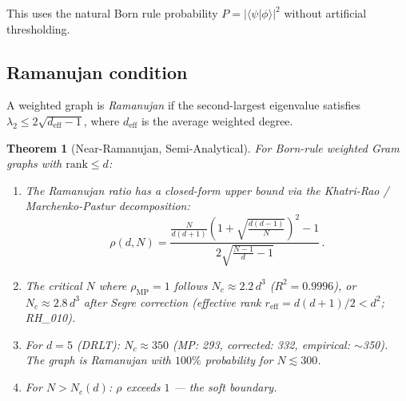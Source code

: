 \documentclass[12pt]{article}
\newtheorem{theorem}{Theorem}[section]
\theoremstyle{definition}
\theoremstyle{remark}
\newcommand{\rank}{\mathrm{rank}}
\begin{document}
This uses the natural Born rule probability
$P = |\langle\psi|\phi\rangle|^2$
without artificial thresholding.

\subsection{Ramanujan condition}

A weighted graph is \emph{Ramanujan} if the second-largest
eigenvalue satisfies
$\lambda_2 \leq 2\sqrt{d_{\mathrm{eff}} - 1}$,
where $d_{\mathrm{eff}}$ is the average weighted degree.

\begin{theorem}[Near-Ramanujan, Semi-Analytical]\label{thm:ram}
For Born-rule weighted Gram graphs with $\rank \leq d$:
\begin{enumerate}[label=(\roman*)]
\item The Ramanujan ratio has a closed-form upper bound via the
  Khatri-Rao / Marchenko-Pastur decomposition:
  \begin{equation}\label{eq:rhoMP}
  \rho(d,N)
    = \frac{\frac{N}{d(d+1)}
      \left(1 + \sqrt{\frac{d(d-1)}{N}}\right)^{\!2} - 1}
      {2\sqrt{\frac{N-1}{d}-1}}\,.
  \end{equation}
\item The critical $N$ where $\rho_{\mathrm{MP}} = 1$
  follows $N_c \approx 2.2\,d^{3}$ ($R^2 = 0.9996$),
  or $N_c \approx 2.8\,d^3$ after Segre correction
  (effective rank $r_{\mathrm{eff}} = d(d{+}1)/2 < d^2$;
  RH\_010).
\item For $d = 5$ (DRLT): $N_c \approx 350$
  (MP: 293, corrected: 332, empirical: $\sim$350).
  The graph is Ramanujan with $100\%$ probability
  for $N \lesssim 300$.
\item For $N > N_c(d)$: $\rho$ exceeds $1$ --- the soft boundary.
\end{enumerate}
\end{theorem}
\end{document}
